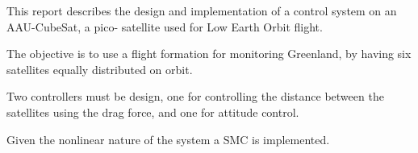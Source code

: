 This report describes the design and implementation of a control system on an AAU-CubeSat, a pico- satellite used for Low Earth Orbit flight.

The objective is to use a flight formation for monitoring Greenland, by having six satellites equally distributed on orbit.

Two controllers must be design, one for controlling the distance between the satellites using the drag force, and one for attitude control.

Given the nonlinear nature of the system a SMC is implemented.
